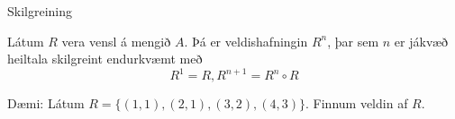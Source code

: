 \documentclass[handout]{beamer}
\begin{document}
\begin{frame}{Skilgreining}
\begin{tcolorbox}[title=Veldishafning]
Látum $R$ vera vensl á mengið $A$. Þá er veldishafningin $R^n$, þar sem $n$ er jákvæð heiltala skilgreint endurkvæmt með
\[
 R^1 = R, R^{n+1} = R^n \circ R
\]
\end{tcolorbox}
Dæmi: Látum $R = \{(1, 1), (2, 1), (3, 2), (4, 3)\}$. Finnum veldin af $R$.
\end{frame}
\end{document}

